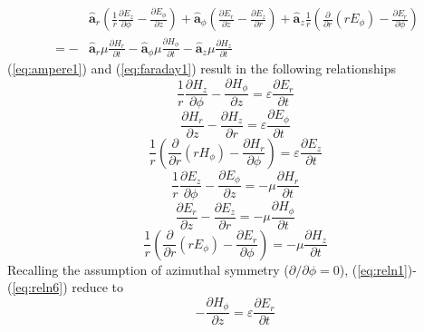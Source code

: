 \begin{equation}\label{eq:faraday1}
	\begin{split}
	&\hat{\mathbf{a}}_r \left( \frac{1}{r} \frac{\partial E_z}{\partial \phi} - \frac{\partial E_\phi}{\partial z} \right)
	+ \hat{\mathbf{a}}_\phi \left( \frac{\partial E_r}{\partial z} - \frac{\partial E_z}{\partial r} \right)
	+ \hat{\mathbf{a}}_z \frac{1}{r} \left( \frac{\partial}{\partial r}(r E_\phi) - \frac{\partial E_r}{\partial \phi} \right) \\
	=
	- &\hat{\mathbf{a}}_r \mu \frac{\partial H_r}{\partial t}
	- \hat{\mathbf{a}}_\phi \mu \frac{\partial H_\phi}{\partial t}
	- \hat{\mathbf{a}}_z \mu \frac{\partial H_z}{\partial t}
	\end{split}
\end{equation}
(\ref{eq:ampere1}) and (\ref{eq:faraday1}) result in the following relationships
\begin{equation}\label{eq:reln1}
	\frac{1}{r} \frac{\partial H_z}{\partial \phi} - \frac{\partial H_\phi}{\partial z} = \varepsilon \frac{\partial E_r}{\partial t}
\end{equation}
\begin{equation}\label{eq:reln2}
	\frac{\partial H_r}{\partial z} - \frac{\partial H_z}{\partial r} = \varepsilon \frac{\partial E_\phi}{\partial t}
\end{equation}
\begin{equation}\label{eq:reln3}
	\frac{1}{r} \left( \frac{\partial}{\partial r} (r H_\phi) - \frac{\partial H_r}{\partial \phi} \right) = \varepsilon \frac{\partial E_z}{\partial t}
\end{equation}
\begin{equation}\label{eq:reln4}
	\frac{1}{r} \frac{\partial E_z}{\partial \phi} - \frac{\partial E_\phi}{\partial z} = -\mu \frac{\partial H_r}{\partial t}
\end{equation}
\begin{equation}\label{eq:reln5}
	\frac{\partial E_r}{\partial z} - \frac{\partial E_z}{\partial r} = -\mu \frac{\partial H_\phi}{\partial t}
\end{equation}
\begin{equation}\label{eq:reln6}
	\frac{1}{r} \left( \frac{\partial}{\partial r} (r E_\phi) - \frac{\partial E_r}{\partial \phi} \right) = -\mu \frac{\partial H_z}{\partial t}
\end{equation}
Recalling the assumption of azimuthal symmetry ($\partial/\partial \phi = 0$), (\ref{eq:reln1})-(\ref{eq:reln6}) reduce to  
\begin{equation}\label{eq:reln7}
	- \frac{\partial H_\phi}{\partial z} = \varepsilon \frac{\partial E_r}{\partial t}
\end{equation}
